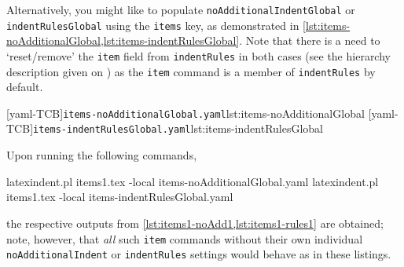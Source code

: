 \documentclass[10pt]{article}
\begin{document}
 \begin{example}
 Alternatively, you might like to populate \texttt{noAdditionalIndentGlobal} or
 \texttt{indentRulesGlobal} using the \texttt{items} key, as demonstrated in
 \cref{lst:items-noAdditionalGlobal,lst:items-indentRulesGlobal}. Note that there is a
 need to `reset/remove' the \texttt{item} field from \texttt{indentRules} in both cases
 (see the hierarchy description given on ) as the
 \texttt{item} command is a member of \texttt{indentRules} by default.

 \begin{cmhtcbraster}
  [yaml-TCB]{\texttt{items-noAdditionalGlobal.yaml}}{lst:items-noAdditionalGlobal}
  [yaml-TCB]{\texttt{items-indentRulesGlobal.yaml}}{lst:items-indentRulesGlobal}
 \end{cmhtcbraster}

 Upon running the following commands, 

 \begin{commandshell}
latexindent.pl items1.tex -local items-noAdditionalGlobal.yaml
latexindent.pl items1.tex -local items-indentRulesGlobal.yaml
\end{commandshell}

 the respective outputs from \cref{lst:items1-noAdd1,lst:items1-rules1} are obtained;
 note, however, that \emph{all} such \texttt{item} commands without their own individual
 \texttt{noAdditionalIndent} or \texttt{indentRules} settings would behave as in these
 listings.
 \end{example}
\end{document}
